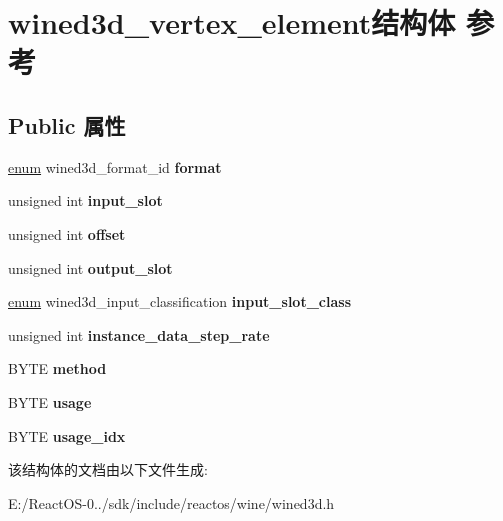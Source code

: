 \hypertarget{structwined3d__vertex__element}{}\section{wined3d\+\_\+vertex\+\_\+element结构体 参考}
\label{structwined3d__vertex__element}
\subsection*{Public 属性}
\begin{DoxyCompactItemize}
\item 
\mbox{\label{structwined3d__vertex__element_a31d13473d51b25b70019caa267c2ff73}} 
\hyperlink{interfaceenum}{enum} wined3d\+\_\+format\+\_\+id {\bfseries format}
\item 
\mbox{\label{structwined3d__vertex__element_a477d5acf541365ee4c65613e3983fb28}} 
unsigned int {\bfseries input\+\_\+slot}
\item 
\mbox{\label{structwined3d__vertex__element_a632bfcc6259cc29f23f776d78d844e40}} 
unsigned int {\bfseries offset}
\item 
\mbox{\label{structwined3d__vertex__element_a01c8bd365d3ef6ed3f646c68230b6000}} 
unsigned int {\bfseries output\+\_\+slot}
\item 
\mbox{\label{structwined3d__vertex__element_a4ef7425c8786e8931c7c0acd2e2346c0}} 
\hyperlink{interfaceenum}{enum} wined3d\+\_\+input\+\_\+classification {\bfseries input\+\_\+slot\+\_\+class}
\item 
\mbox{\label{structwined3d__vertex__element_a532fe78bd370a981c6d593d50176cdf2}} 
unsigned int {\bfseries instance\+\_\+data\+\_\+step\+\_\+rate}
\item 
\mbox{\label{structwined3d__vertex__element_a7f6358d7bcde8899cb495653f4b266a2}} 
B\+Y\+TE {\bfseries method}
\item 
\mbox{\label{structwined3d__vertex__element_a96aa2b98d25a888357834dbbfaefd912}} 
B\+Y\+TE {\bfseries usage}
\item 
\mbox{\label{structwined3d__vertex__element_ae707fae4701ceb9a7d9f715676b15ca4}} 
B\+Y\+TE {\bfseries usage\+\_\+idx}
\end{DoxyCompactItemize}


该结构体的文档由以下文件生成\+:\begin{DoxyCompactItemize}
\item 
E\+:/\+React\+O\+S-\/0../sdk/include/reactos/wine/wined3d.\+h\end{DoxyCompactItemize}
